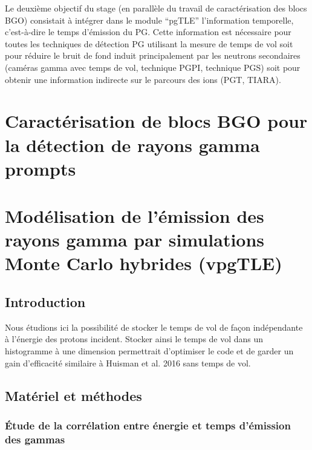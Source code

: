 \documentclass[11pt,a4paper,oldfontcommands]{memoir}
\begin{document}
Le deuxième objectif du stage (en parallèle du travail de caractérisation des blocs BGO) consistait à intégrer dans le module \enquote{pgTLE} l'information temporelle, c'est-à-dire le temps d'émission du PG. Cette information est nécessaire pour toutes les techniques de détection PG utilisant la mesure de temps de vol soit pour réduire le bruit de fond induit principalement par les neutrons secondaires (caméras gamma avec temps de vol, technique PGPI, technique PGS) soit pour obtenir une information indirecte sur le parcours des ions (PGT, TIARA).


\openany
\chapter{Caractérisation de blocs BGO pour la détection de rayons gamma prompts}



\chapter{Modélisation de l'émission des rayons gamma par simulations Monte Carlo hybrides (vpgTLE)}

\section{Introduction}

 Nous étudions ici la possibilité de stocker le temps de vol de façon indépendante à l'énergie des protons incident. Stocker ainsi le temps de vol dans un histogramme à une dimension permettrait d'optimiser le code et de garder un gain d'efficacité similaire à Huisman et al. 2016 sans temps de vol. 


\section{Matériel et méthodes}

\subsection{\'Etude de la corrélation entre énergie et temps d'émission des gammas}
\end{document}
